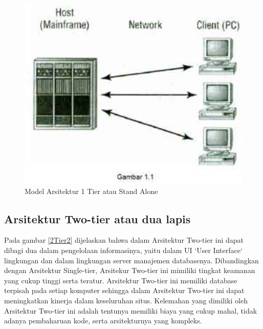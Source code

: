 {\begin{figure}[ht]
    \centerline{\includegraphics[width=1\textwidth]{figures/2modelstandalone.jpg}}
    \caption{Model Arsitektur 1 Tier atau Stand Alone}
    \label{1Stand}
\end{figure}

\subsection{Arsitektur Two-tier atau dua lapis}
Pada gambar \ref{2Tier2} dijelaskan bahwa dalam Arsitektur Two-tier ini dapat dibagi dua dalam pengelolaan informasinya, yaitu dalam UI `User Interface` lingkungan dan dalam
lingkungan server manajemen databasenya. Dibandingkan dengan Arsitektur Single-tier, Arsitekur Two-tier ini mimiliki tingkat
keamanan yang cukup tinggi serta teratur. Arsitektur Two-tier ini memiliki database terpisah pada setiap komputer sehingga dalam
Arsitektur Two-tier ini dapat meningkatkan kinerja dalam keseluruhan situs. Kelemahan yang dimiliki oleh Arsitektur Two-tier ini
adalah tentunya memiliki biaya yang cukup mahal, tidak adanya pembaharuan kode, serta arsitekturnya yang kompleks.

}
